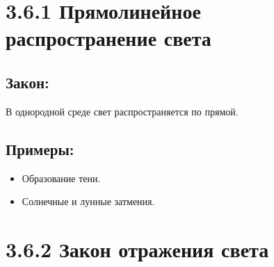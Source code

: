 \documentclass[a4paper,12pt]{article}
\begin{document}
\begin{center}
\end{center}

\vspace{-2.5em}








\section*{3.6.1 Прямолинейное распространение света}
\vspace{-9pt}
\subsection*{Закон:}
\vspace{-3pt}
В однородной среде свет распространяется по прямой.

\vspace{-9pt}
\subsection*{Примеры:}
\vspace{-3pt}
\begin{itemize}
    \item Образование тени.
    \item Солнечные и лунные затмения.
\end{itemize}


\section*{3.6.2 Закон отражения света}
\vspace{-9pt}
\end{document}
